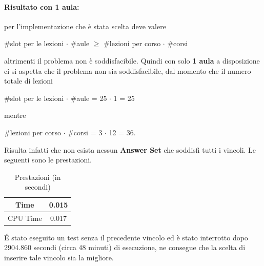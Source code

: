 \documentclass[a4paper,oneside,12pt]{book}
\begin{document}
    \paragraph{Risultato con 1 aula:}

    per l'implementazione che è stata scelta deve valere
    \begin{center}

        \#slot per le lezioni $\cdot$ \#aule  $\ge$ \#lezioni per corso $\cdot$ \#corsi
    \end{center}
    altrimenti il problema non è soddisfacibile. Quindi con solo \textbf{1 aula} a disposizione ci si aspetta che il problema non sia soddisfacibile, dal momento che il numero totale di lezioni
    \begin{center}

        \#slot per le lezioni $\cdot$ \#aule  = 25 $\cdot$ 1 = 25\\
    \end{center}
    mentre
    \begin{center}
        \#lezioni per corso $\cdot$ \#corsi  = 3 $\cdot$ 12 = 36.\\
    \end{center}
    Risulta infatti che non esista nessun \textbf{Answer Set} che soddisfi tutti i vincoli. Le seguenti sono le prestazioni.
    \FloatBarrier
    \begin{table}[htb]
        \centering
        \begin{tabular}{|c | c|}
            \hline
            Time &0.015\\
            \hline
            CPU Time &0.017\\
            \hline
        \end{tabular}
        \caption{Prestazioni (in secondi)}
    \end{table}
    \FloatBarrier
    \noindent \'E stato eseguito un test senza il precedente vincolo ed è stato interrotto dopo 2904.860 secondi (circa 48 minuti) di esecuzione, ne consegue che la scelta di inserire tale vincolo sia la migliore.
\end{document}
